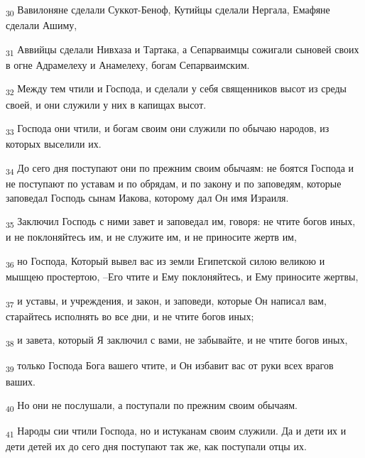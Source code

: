 \begin{tcolorbox}
\textsubscript{30} Вавилоняне сделали Суккот-Беноф, Кутийцы сделали Нергала, Емафяне сделали Ашиму,
\end{tcolorbox}
\begin{tcolorbox}
\textsubscript{31} Аввийцы сделали Нивхаза и Тартака, а Сепарваимцы сожигали сыновей своих в огне Адрамелеху и Анамелеху, богам Сепарваимским.
\end{tcolorbox}
\begin{tcolorbox}
\textsubscript{32} Между тем чтили и Господа, и сделали у себя священников высот из среды своей, и они служили у них в капищах высот.
\end{tcolorbox}
\begin{tcolorbox}
\textsubscript{33} Господа они чтили, и богам своим они служили по обычаю народов, из которых выселили их.
\end{tcolorbox}
\begin{tcolorbox}
\textsubscript{34} До сего дня поступают они по прежним своим обычаям: не боятся Господа и не поступают по уставам и по обрядам, и по закону и по заповедям, которые заповедал Господь сынам Иакова, которому дал Он имя Израиля.
\end{tcolorbox}
\begin{tcolorbox}
\textsubscript{35} Заключил Господь с ними завет и заповедал им, говоря: не чтите богов иных, и не поклоняйтесь им, и не служите им, и не приносите жертв им,
\end{tcolorbox}
\begin{tcolorbox}
\textsubscript{36} но Господа, Который вывел вас из земли Египетской силою великою и мышцею простертою, --Его чтите и Ему поклоняйтесь, и Ему приносите жертвы,
\end{tcolorbox}
\begin{tcolorbox}
\textsubscript{37} и уставы, и учреждения, и закон, и заповеди, которые Он написал вам, старайтесь исполнять во все дни, и не чтите богов иных;
\end{tcolorbox}
\begin{tcolorbox}
\textsubscript{38} и завета, который Я заключил с вами, не забывайте, и не чтите богов иных,
\end{tcolorbox}
\begin{tcolorbox}
\textsubscript{39} только Господа Бога вашего чтите, и Он избавит вас от руки всех врагов ваших.
\end{tcolorbox}
\begin{tcolorbox}
\textsubscript{40} Но они не послушали, а поступали по прежним своим обычаям.
\end{tcolorbox}
\begin{tcolorbox}
\textsubscript{41} Народы сии чтили Господа, но и истуканам своим служили. Да и дети их и дети детей их до сего дня поступают так же, как поступали отцы их.
\end{tcolorbox}
